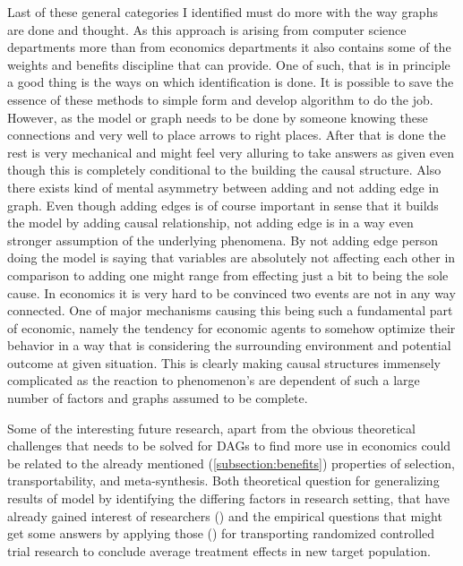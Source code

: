 \documentclass[main=english,12pt,a4paper,pdftex,econ,utf8]{aaltothesis}
\begin{document}
Last of these general categories I identified must do more with the way graphs are done and thought. As this approach is arising from computer science departments more than from economics departments it also contains some of the weights and benefits discipline that can provide. One of such, that is in principle a good thing is the ways on which identification is done. It is possible to save the essence of these methods to simple form and develop algorithm to do the job. However, as the model or graph needs to be done by someone knowing these connections and very well to place arrows to right places. After that is done the rest is very mechanical and might feel very alluring to take answers as given even though this is completely conditional to the building the causal structure. Also there exists kind of mental asymmetry between adding and not adding edge in graph. Even though adding edges is of course important in sense that it builds the model by adding causal relationship, not adding edge is in a way even stronger assumption of the underlying phenomena. By not adding edge person doing the model is saying that variables are absolutely not affecting each other in comparison to adding one might range from effecting just a bit to being the sole cause. In economics it is very hard to be convinced two events are not in any way connected. One of major mechanisms causing this being such a fundamental part of economic, namely the tendency for economic agents to somehow optimize their behavior in a way that is considering the surrounding environment and potential outcome at given situation. This is clearly making causal structures immensely complicated as the reaction to phenomenon's are dependent of such a large number of factors and graphs assumed to be complete.

Some of the interesting future research, apart from the obvious theoretical challenges that needs to be solved for DAGs to find more use in economics could be related to the already mentioned (\ref{subsection:benefits}) properties of selection, transportability, and meta-synthesis. Both theoretical question for generalizing results of model by identifying the differing factors in research setting, that have already gained interest of researchers (\cite{Cinelli2021}) and the empirical questions that might get some answers by applying those (\cite{Dahabreh2020}) for transporting randomized controlled trial research to conclude average treatment effects in new target population.
\end{document}
